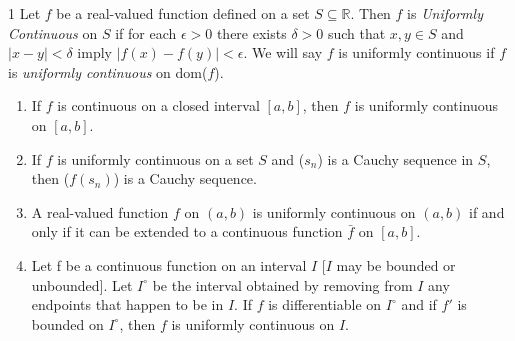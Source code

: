 \begin{defn}{1}
	Let $f$ be a real-valued function defined on a set $S \subseteq \mathbb{R}$. Then $f$ is \textit{Uniformly Continuous} on $S$ if for each $\epsilon > 0$ there exists $\delta > 0$ such that $x, y \in S$ and $|x-y| < \delta$ imply $|f(x)- f(y)| < \epsilon$. We will say $f$ is uniformly continuous if $f$ is \textit{uniformly continuous} on dom($f$).
	\begin{enumerate}
		\item If $f$ is continuous on a closed interval $[a, b]$, then $f$ is uniformly continuous on $[a, b]$.
		\item If $f$ is uniformly continuous on a set $S$ and ($s_n$) is a Cauchy sequence in $S$, then ($f(s_n)$) is a Cauchy sequence.
		\item A real-valued function $f$ on $(a, b)$ is uniformly continuous on $(a, b)$ if and only if it can be extended to a continuous function $\bar{f}$ on $[a, b]$.
		\item Let f be a continuous function on an interval $I$ [$I$ may be bounded	or unbounded]. Let $I^\circ$ be the interval obtained by removing from $I$	any endpoints that happen to be in $I$. If $f$ is differentiable on $I^\circ$ and if $f'$ is bounded on $I^\circ$, then $f$ is uniformly continuous on $I$.
	\end{enumerate}
\end{defn}

